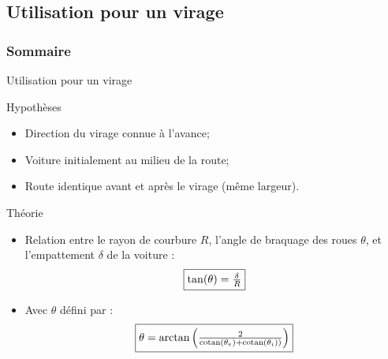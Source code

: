 \documentclass[french, handout]{beamer}
\DeclareMathOperator{\cotan}{cotan}
\begin{document}
        \subsection{Utilisation pour un virage}
        \begin{frame}
        \frametitle{Sommaire}
        \tableofcontents[sections=4, currentsubsection]
        \end{frame}
        \begin{frame}{Utilisation pour un virage}
            \begin{block}{Hypothèses}
            \begin{itemize}
                \item Direction du virage connue à l'avance;
                \item Voiture initialement au milieu de la route;
                \item Route identique avant et après le virage (même largeur).
            \end{itemize}
            \end{block}
            \begin{block}{Théorie}
            \begin{itemize}
                \item Relation entre le rayon de courbure $R$, l'angle de braquage des roues $\theta$, et l'empattement $\delta$ de la voiture : 
                \[\fbox{$\tan(\theta) = \frac{\delta}{R}$}\]
                \item Avec $\theta$ défini par : \[\fbox{$\theta=\arctan\left(\frac{2}{\cotan(\theta_e)+\cotan(\theta_i))}\right)$}\]
            \end{itemize}
            \end{block}
        \end{frame}
        
\end{document}
